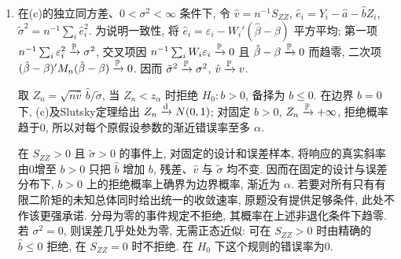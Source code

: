 \begin{solution}
\begin{enumerate}[label=\arabic*.]
\begin{enumerate}[label=\alph*)]
\[-\begin{pmatrix}a\\b\end{pmatrix}\right\}
=M_n^{-1}\frac1{\sqrt n}\sum_iW_i\varepsilon_i
\dto N_2(0,\sigma^2M^{-1}).
\]
求二阶逆矩阵即得渐近协方差
\[
\frac{\sigma^2}{v}\begin{pmatrix}m_2&-\mu\\-\mu&1\end{pmatrix}.
\]
这里指 $\sqrt n$ 缩放后的极限协方差; 未缩放估计的近似协方差还要除以 $n$.
\item 在(c)的独立同方差、$0<\sigma^2<\infty$ 条件下, 令 $\hat v=n^{-1}S_{ZZ}$, $\hat e_i=Y_i-\hat a-\hat bZ_i$, $\tilde\sigma^2=n^{-1}\sum_i\hat e_i^2$. 为说明一致性, 将 $\hat e_i=\varepsilon_i-W_i'(\hat\beta-\beta)$ 平方平均; 第一项 $n^{-1}\sum_i\varepsilon_i^2\xrightarrow{\mathbb P}\sigma^2$, 交叉项因 $n^{-1}\sum_iW_i\varepsilon_i\xrightarrow{\mathbb P}0$ 且 $\hat\beta-\beta\xrightarrow{\mathbb P}0$ 而趋零, 二次项 $(\hat\beta-\beta)'M_n(\hat\beta-\beta)\xrightarrow{\mathbb P}0$. 因而 $\tilde\sigma^2\xrightarrow{\mathbb P}\sigma^2$, $\hat v\xrightarrow{\mathbb P} v$.

取 $Z_n=\sqrt{n\hat v}\,\hat b/\tilde\sigma$, 当 $Z_n<z_\alpha$ 时拒绝 $H_0:b>0$, 备择为 $b\le0$. 在边界 $b=0$ 下, (c)及Slutsky定理给出 $Z_n\xrightarrow{\mathrm d} N(0,1)$; 对固定 $b>0$, $Z_n\xrightarrow{\mathbb P}+\infty$, 拒绝概率趋于0, 所以对每个原假设参数的渐近错误率至多 $\alpha$.

在 $S_{ZZ}>0$ 且 $\tilde\sigma>0$ 的事件上, 对固定的设计和误差样本, 将响应的真实斜率由0增至 $b>0$ 只把 $\hat b$ 增加 $b$, 残差、$\hat v$ 与 $\tilde\sigma$ 均不变. 因而在固定的设计与误差分布下, $b>0$ 上的拒绝概率上确界为边界概率, 渐近为 $\alpha$. 若要对所有只有有限二阶矩的未知总体同时给出统一的收敛速率, 原题没有提供足够条件, 此处不作该更强承诺. 分母为零的事件规定不拒绝, 其概率在上述非退化条件下趋零. 若 $\sigma^2=0$, 则误差几乎处处为零, 无需正态近似: 可在 $S_{ZZ}>0$ 时由精确的 $\hat b\le0$ 拒绝, 在 $S_{ZZ}=0$ 时不拒绝. 在 $H_0$ 下这个规则的错误率为0.
\end{enumerate}
\end{enumerate}
\end{solution}

